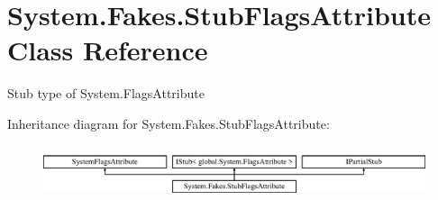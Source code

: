 \hypertarget{class_system_1_1_fakes_1_1_stub_flags_attribute}{\section{System.\-Fakes.\-Stub\-Flags\-Attribute Class Reference}
\label{class_system_1_1_fakes_1_1_stub_flags_attribute}
}


Stub type of System.\-Flags\-Attribute 


Inheritance diagram for System.\-Fakes.\-Stub\-Flags\-Attribute\-:\begin{figure}[H]
\begin{center}
\leavevmode
\includegraphics[height=1.609195cm]{class_system_1_1_fakes_1_1_stub_flags_attribute}
\end{center}
\end{figure}
